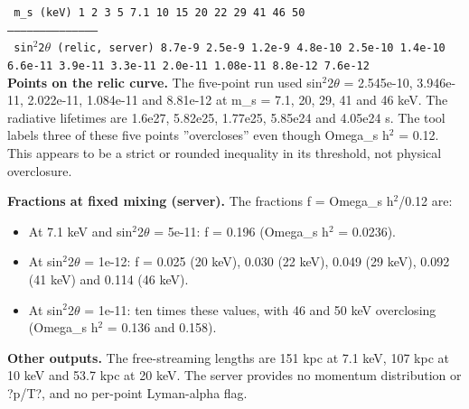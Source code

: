 \documentclass[11pt,a4paper]{article}
\begin{document}
\texttt{\textbar{}\allowbreak{} m\_\allowbreak{}s (keV)\allowbreak{} \textbar{}\allowbreak{} 1 \textbar{}\allowbreak{} 2 \textbar{}\allowbreak{} 3 \textbar{}\allowbreak{} 5 \textbar{}\allowbreak{} 7.1 \textbar{}\allowbreak{} 10 \textbar{}\allowbreak{} 15 \textbar{}\allowbreak{} 20 \textbar{}\allowbreak{} 22 \textbar{}\allowbreak{} 29 \textbar{}\allowbreak{} 41 \textbar{}\allowbreak{} 46 \textbar{}\allowbreak{} 50 \textbar{}\allowbreak{}}\\
\texttt{\textbar{}\allowbreak{}---\textbar{}\allowbreak{}---\textbar{}\allowbreak{}---\textbar{}\allowbreak{}---\textbar{}\allowbreak{}---\textbar{}\allowbreak{}---\textbar{}\allowbreak{}---\textbar{}\allowbreak{}---\textbar{}\allowbreak{}---\textbar{}\allowbreak{}---\textbar{}\allowbreak{}---\textbar{}\allowbreak{}---\textbar{}\allowbreak{}---\textbar{}\allowbreak{}---\textbar{}\allowbreak{}}\\
\texttt{\textbar{}\allowbreak{} sin$^2$2$\theta$ (relic,\allowbreak{} server)\allowbreak{} \textbar{}\allowbreak{} 8.7e-9 \textbar{}\allowbreak{} 2.5e-9 \textbar{}\allowbreak{} 1.2e-9 \textbar{}\allowbreak{} 4.8e-10 \textbar{}\allowbreak{} 2.5e-10 \textbar{}\allowbreak{} 1.4e-10 \textbar{}\allowbreak{} 6.6e-11 \textbar{}\allowbreak{} 3.9e-11 \textbar{}\allowbreak{} 3.3e-11 \textbar{}\allowbreak{} 2.0e-11 \textbar{}\allowbreak{} 1.08e-11 \textbar{}\allowbreak{} 8.8e-12 \textbar{}\allowbreak{} 7.6e-12 \textbar{}\allowbreak{}}\\
\textbf{Points on the relic curve.} The five-point run used sin$^2$2$\theta$ = 2.545e-10, 3.946e-11, 2.022e-11, 1.084e-11 and 8.81e-12 at m\_s = 7.1, 20, 29, 41 and 46 keV. The radiative lifetimes are 1.6e27, 5.82e25, 1.77e25, 5.85e24 and 4.05e24 s. The tool labels three of these five points ''overcloses'' even though Omega\_s h$^2$ = 0.12. This appears to be a strict or rounded inequality in its threshold, not physical overclosure.

\textbf{Fractions at fixed mixing (server).} The fractions f = Omega\_s h$^2$/0.12 are:

\begin{itemize}
  \item At 7.1 keV and sin$^2$2$\theta$ = 5e-11: f = 0.196 (Omega\_s h$^2$ = 0.0236).
  \item At sin$^2$2$\theta$ = 1e-12: f = 0.025 (20 keV), 0.030 (22 keV), 0.049 (29 keV), 0.092 (41 keV) and 0.114 (46 keV).
  \item At sin$^2$2$\theta$ = 1e-11: ten times these values, with 46 and 50 keV overclosing (Omega\_s h$^2$ = 0.136 and 0.158).
\end{itemize}
\textbf{Other outputs.} The free-streaming lengths are 151 kpc at 7.1 keV, 107 kpc at 10 keV and 53.7 kpc at 20 keV. The server provides no momentum distribution or ?p/T?, and no per-point Lyman-alpha flag.
\end{document}
